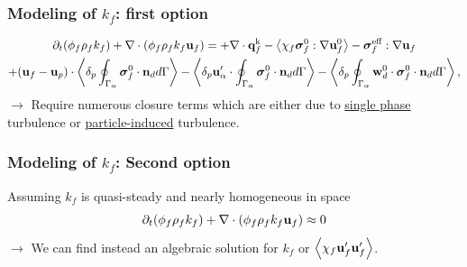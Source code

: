 \documentclass{sintefbeamer}
\begin{document}
\begin{frame}
  \frametitle{Modeling of $k_f$: first option}

\begin{multline}
  \partial_t (\phi_f\rho_fk_f)  
    + \mathbf{\nabla}\cdot (
        \phi_f\rho_fk_f\textbf{u}_f
        )
        = 
      + \mathbf{\nabla}\cdot  \textbf{q}_f^\text{k}
    - \left<\chi_f\bm{\sigma}_f^0 : \mathbf{\nabla} \textbf{u}_f^0\right>
    - \bm{\sigma}_f^\text{eff} : \mathbf{\nabla} \textbf{u}_f
    \nonumber \\
    + (\textbf{u}_f - \textbf{u}_p)\cdot \left<\delta_p \oint_{\Gamma_{\alpha}} {\bm{\sigma}_f^0 \cdot \textbf{n}_d} d\Gamma\right> 
    - \left<\delta_p  \textbf{u}_\alpha' \cdot \oint_{\Gamma_{\alpha}}   \bm{\sigma}_f^0 \cdot \textbf{n}_d d\Gamma\right>
    - \left<\delta_p  \oint_{\Gamma_{\alpha}} \textbf{w}_d^0 \cdot \bm{\sigma}_f^0 \cdot \textbf{n}_d d\Gamma\right>,
\end{multline}
\vfill
$\to$ Require numerous closure terms which are either due to \underline{single phase} turbulence or \underline{particle-induced} turbulence. 

\end{frame}
\begin{frame}
  \frametitle{Modeling of $k_f$: Second option}
Assuming $k_f$ is quasi-steady and nearly homogeneous in space
\begin{equation}
  \partial_t (\phi_f\rho_fk_f)  
    + \mathbf{\nabla}\cdot (
        \phi_f\rho_fk_f\textbf{u}_f
        )
        \approx 
    0 
\end{equation}
\vfill
$\to$ We can find instead an algebraic solution for $k_f$ or $\left<\chi_f \textbf{u}_f'\textbf{u}_f'\right>$. 
\end{frame}
\end{document}
